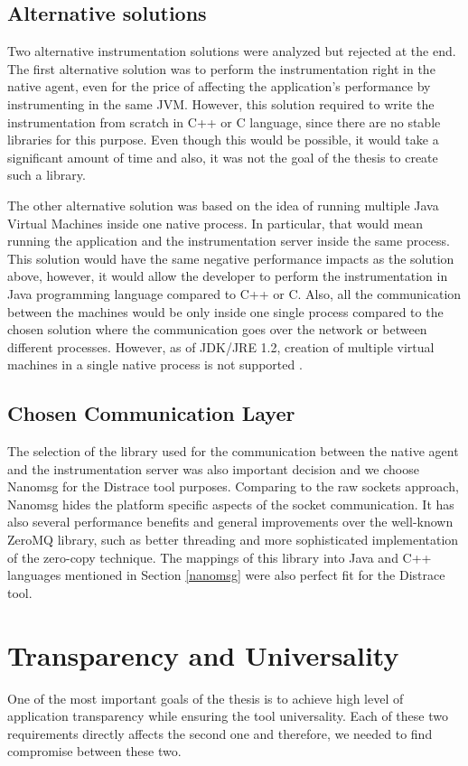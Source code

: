 \subsection{Alternative solutions}
Two alternative instrumentation solutions were analyzed but rejected at the end. The first alternative solution was to perform the instrumentation right in the native agent, even for the price of affecting the application's performance by instrumenting in the same JVM. However, this solution required to write the instrumentation from scratch in C++ or C language, since there are no stable libraries for this purpose. Even though this would be possible, it would take a significant amount of time and also, it was not the goal of the thesis to create such a library.

The other alternative solution was based on the idea of running multiple Java Virtual Machines inside one native process. In particular, that would mean running the application and the instrumentation server inside the same process. This solution would have the same negative performance impacts as the solution above, however, it would allow the developer to perform the instrumentation in Java programming language compared to C++ or C. Also, all the communication between the machines would be only inside one single process compared to the chosen solution where the communication goes over the network or between different processes. However, as of JDK/JRE 1.2, creation of multiple virtual machines in a single native process is not supported \cite{MoreJVMOnceProccess}.
							
\subsection{Chosen Communication Layer}
The selection of the library used for the communication between the native agent and the instrumentation server was also important decision and we choose Nanomsg for the Distrace tool purposes. Comparing to the raw sockets approach, Nanomsg hides the platform specific aspects of the socket communication. It has also several performance benefits and general improvements over the well-known ZeroMQ library, such as better threading and more sophisticated implementation of the zero-copy technique. The mappings of this library into Java and C++ languages mentioned in Section \ref{nanomsg} were also perfect fit for the Distrace tool.
		
\section{Transparency and Universality}
One of the most important goals of the thesis is to achieve high level of application transparency while ensuring the tool universality. Each of these two requirements directly affects the second one and therefore, we needed to find compromise between these two.

